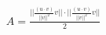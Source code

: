 \documentclass[preview]{standalone}
\begin{document}
\begin{align*}
A=\frac{||\frac{(u \cdot v)}{||v||^2}v|| \cdot ||\frac{(u\cdot v)}{||v||^2}v||}{2}
\end{align*}
\end{document}
